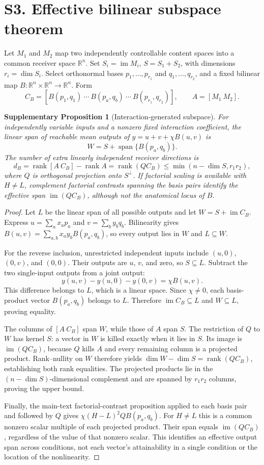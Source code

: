 \documentclass[11pt,a4paper]{article}
\newtheorem{proposition}{Supplementary Proposition}
\DeclareMathOperator{\im}{im}\DeclareMathOperator{\rank}{rank}
\begin{document}
\section*{S3. Effective bilinear subspace theorem}
Let $M_1$ and $M_2$ map two independently controllable content spaces into a common receiver space $\mathbb R^n$. Set $S_i=\im M_i$, $S=S_1+S_2$, with dimensions $r_i=\dim S_i$. Select orthonormal bases $p_1,\ldots,p_{r_1}$ and $q_1,\ldots,q_{r_2}$, and a fixed bilinear map $B:\mathbb R^n\times\mathbb R^n\to\mathbb R^n$. Form
\[
 C_B=[B(p_1,q_1)\ \cdots\ B(p_a,q_b)\ \cdots\ B(p_{r_1},q_{r_2})],
 \qquad A=[M_1\ M_2].
\]
\begin{proposition}[Interaction-generated subspace]
For independently variable inputs and a nonzero fixed interaction coefficient, the linear span of reachable mean outputs of $y=u+v+\chi B(u,v)$ is
\[
 W=S+\operatorname{span}\{B(p_a,q_b)\}.
\]
The number of extra linearly independent receiver directions is
\[
 d_B=\rank[A\ C_B]-\rank A=\rank(QC_B)
 \le\min(n-\dim S,r_1r_2),
\]
where $Q$ is orthogonal projection onto $S^\perp$. If factorial scaling is available with $H\ne L$, complement factorial contrasts spanning the basis pairs identify the effective span $\im(QC_B)$, although not the anatomical locus of $B$.
\end{proposition}
\begin{proof}
Let $L$ be the linear span of all possible outputs and let $W=S+\im C_B$. Express $u=\sum_a x_ap_a$ and $v=\sum_b y_bq_b$. Bilinearity gives $B(u,v)=\sum_{a,b}x_ay_bB(p_a,q_b)$, so every output lies in $W$ and $L\subseteq W$.

For the reverse inclusion, unrestricted independent inputs include $(u,0)$, $(0,v)$, and $(0,0)$. Their outputs are $u$, $v$, and zero, so $S\subseteq L$. Subtract the two single-input outputs from a joint output:
\[
y(u,v)-y(u,0)-y(0,v)=\chi B(u,v).
\]
This difference belongs to $L$, which is a linear space. Since $\chi\ne0$, each basis-product vector $B(p_a,q_b)$ belongs to $L$. Therefore $\im C_B\subseteq L$ and $W\subseteq L$, proving equality.

The columns of $[A\ C_B]$ span $W$, while those of $A$ span $S$. The restriction of $Q$ to $W$ has kernel $S$: a vector in $W$ is killed exactly when it lies in $S$. Its image is $\im(QC_B)$, because $Q$ kills $A$ and every remaining column is a projected product. Rank--nullity on $W$ therefore yields $\dim W-\dim S=\rank(QC_B)$, establishing both rank equalities. The projected products lie in the $(n-\dim S)$-dimensional complement and are spanned by $r_1r_2$ columns, proving the upper bound.

Finally, the main-text factorial-contrast proposition applied to each basis pair and followed by $Q$ gives $\chi(H-L)^2QB(p_a,q_b)$. For $H\ne L$ this is a common nonzero scalar multiple of each projected product. Their span equals $\im(QC_B)$, regardless of the value of that nonzero scalar. This identifies an effective output span across conditions, not each vector's attainability in a single condition or the location of the nonlinearity.
\end{proof}
\end{document}
